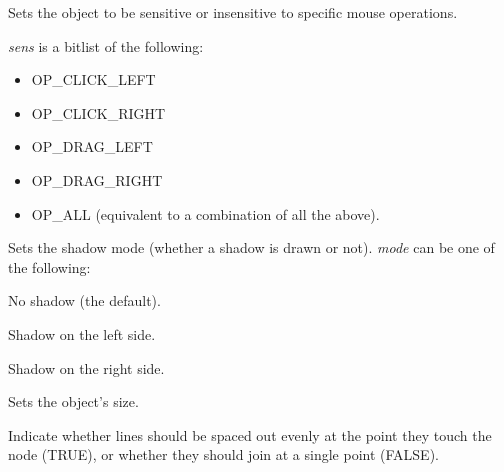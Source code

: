 \label{setsensitivityfilter}


Sets the object to be sensitive or insensitive to specific mouse operations.

{\it sens} is a bitlist of the following:

\begin{itemize}\itemsep=0pt
\item OP\_CLICK\_LEFT
\item OP\_CLICK\_RIGHT
\item OP\_DRAG\_LEFT
\item OP\_DRAG\_RIGHT
\item OP\_ALL (equivalent to a combination of all the above).
\end{itemize}

\label{setshadowmode}


Sets the shadow mode (whether a shadow is drawn or not). {\it mode} can be one of
the following:

\begin{description}\itemsep=0pt
\item[SHADOW\_NONE] No shadow (the default).
\item[SHADOW\_LEFT] Shadow on the left side.
\item[SHADOW\_RIGHT] Shadow on the right side.
\end{description}



Sets the object's size.



Indicate whether lines should be spaced out evenly at the point they touch the node (TRUE), or whether they
should join at a single point (FALSE).



